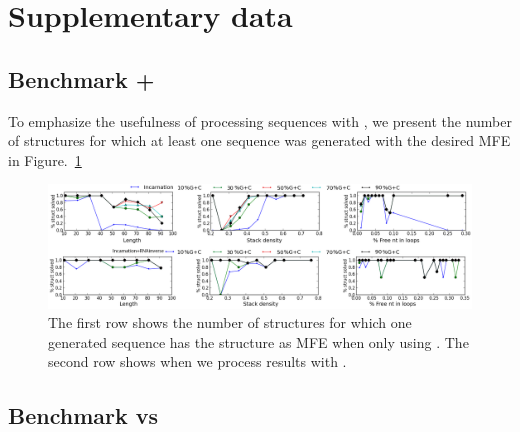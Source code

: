 \section{Supplementary data}

\subsection{Benchmark \ourprog+\RNAinverse}
To emphasize the usefulness of processing \ourprog sequences with \RNAinverse, we present the number
of structures for which at least one sequence was generated with the desired MFE in Figure.~\ref{fig:nb_sols}

\begin{figure}[ht!]
  \centering
  \includegraphics[width=\textwidth]{Figures/struct_solved_vsrnainverse.png}
  \caption{The first row shows the number of structures for which one generated sequence has the 
  structure as MFE when only using \ourprog. The second row shows when we process \ourprog results with \RNAinverse.}
  \label{fig:nb_sols}
\end{figure}


\subsection{Benchmark \ourprog vs \RNASSD}


